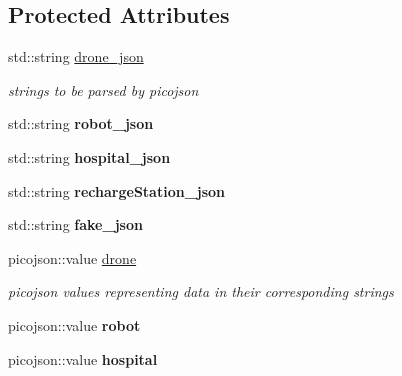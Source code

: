 \subsection*{Protected Attributes}
\begin{DoxyCompactItemize}
\item 
\mbox{\label{classFactoryTest_a79ee36408a3bd0b9e3832aef0faf4aa9}} 
std\+::string \hyperlink{classFactoryTest_a79ee36408a3bd0b9e3832aef0faf4aa9}{drone\+\_\+json}
\begin{DoxyCompactList}\small\item\em strings to be parsed by picojson \end{DoxyCompactList}\item 
\mbox{\label{classFactoryTest_a9aa8980ff0605062f20d1aa4930de3ee}} 
std\+::string {\bfseries robot\+\_\+json}
\item 
\mbox{\label{classFactoryTest_a083b566a58b74697cdb363be436282e9}} 
std\+::string {\bfseries hospital\+\_\+json}
\item 
\mbox{\label{classFactoryTest_a6f96ef63a5f27273da007b8acf6653aa}} 
std\+::string {\bfseries recharge\+Station\+\_\+json}
\item 
\mbox{\label{classFactoryTest_ab97fe3337f18068d9bac86868e140abc}} 
std\+::string {\bfseries fake\+\_\+json}
\item 
\mbox{\label{classFactoryTest_ae385a634555c4972f9447b8524b1e3c4}} 
picojson\+::value \hyperlink{classFactoryTest_ae385a634555c4972f9447b8524b1e3c4}{drone}
\begin{DoxyCompactList}\small\item\em picojson values representing data in their corresponding strings \end{DoxyCompactList}\item 
\mbox{\label{classFactoryTest_a294af5fb898c91dbe57e39c9fb02c526}} 
picojson\+::value {\bfseries robot}
\item 
\mbox{\label{classFactoryTest_aa9ccd66d84c4b78b2d8b40b8ed8fb047}} 
picojson\+::value {\bfseries hospital}
\item 

\end{DoxyCompactItemize}
